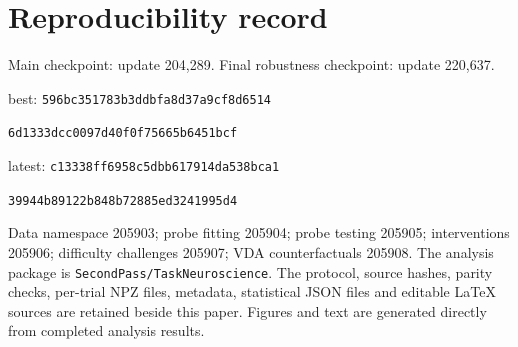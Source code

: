\documentclass[11pt]{article}
\begin{document}
\clearpage\section{Reproducibility record}
Main checkpoint: update 204,289. Final robustness checkpoint: update 220,637.

best: \texttt{596bc351783b3ddbfa8d37a9cf8d6514}\par\texttt{6d1333dcc0097d40f0f75665b6451bcf}

latest: \texttt{c13338ff6958c5dbb617914da538bca1}\par\texttt{39944b89122b848b72885ed3241995d4}

Data namespace 205903; probe fitting 205904; probe testing 205905; interventions 205906; difficulty challenges 205907; VDA counterfactuals 205908. The analysis package is \texttt{SecondPass/TaskNeuroscience}. The protocol, source hashes, parity checks, per-trial NPZ files, metadata, statistical JSON files and editable LaTeX sources are retained beside this paper. Figures and text are generated directly from completed analysis results.
\end{document}
